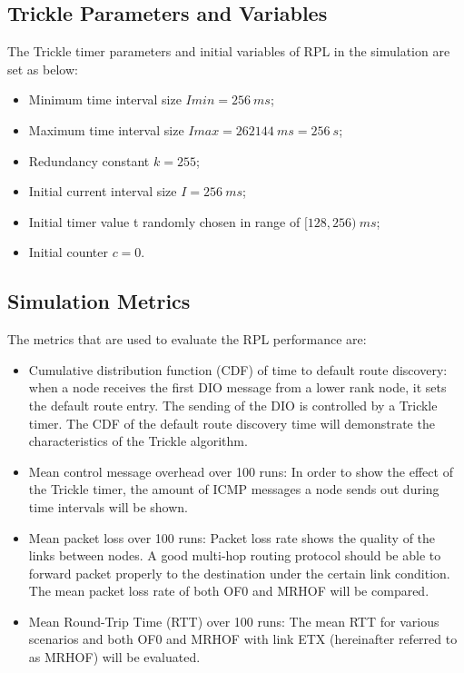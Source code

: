 \subsection{Trickle Parameters and Variables}
\label{trickle parameters}
The Trickle timer parameters and initial variables of RPL in the simulation are set as below:
\begin{itemize}
\item Minimum time interval size $Imin = 256\:ms$;

\item Maximum time interval size $Imax = 262144\:ms = 256\:s$;

\item Redundancy constant $k = 255$;

\item Initial current interval size $I = 256\:ms$;

\item Initial timer value t randomly chosen in range of $[128, 256)\:ms$;

\item Initial counter $c=0$.
\end{itemize}

\subsection{Simulation Metrics}
\label{Sim:metrics}
The metrics that are used to evaluate the RPL performance are:
\begin{itemize}
\item Cumulative distribution function (CDF) of time to default route discovery: when a node receives the first DIO message from a lower rank node, it sets the default route entry. The sending of the DIO is controlled by a Trickle timer. The CDF of the default route discovery time will demonstrate the characteristics of the Trickle algorithm.

\item Mean control message overhead over 100 runs: In order to show the effect of the Trickle timer, the amount of ICMP messages a node sends out during time intervals will be shown.

\item Mean packet loss over 100 runs: Packet loss rate shows the quality of the links between nodes. A good multi-hop routing protocol should be able to forward packet properly to the destination under the certain link condition. The mean packet loss rate of both OF0 and MRHOF will be compared.

\item Mean Round-Trip Time (RTT) over 100 runs: The mean RTT for various scenarios and both OF0 and MRHOF with link ETX (hereinafter referred to as MRHOF) will be evaluated.

\end{itemize}







